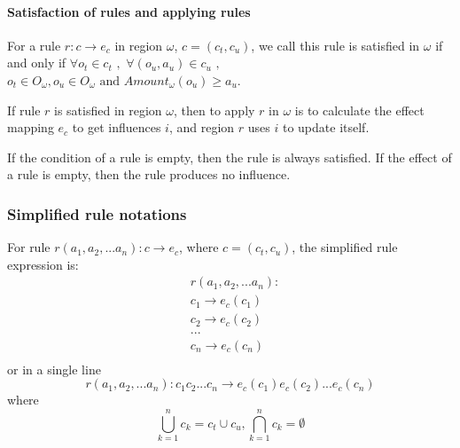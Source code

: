 \documentclass[9pt,a4paper,twoside]{article}
\begin{document}
            \paragraph{Satisfaction of rules and applying rules}  
                       
                For a rule $r: c \rightarrow e_c$ in region $\omega$, $c = (c_t, c_u)$, we call this rule is satisfied in $\omega$ if and only if 
                $\forall o_t \in c_t$ $,$ $ \forall (o_u, a_u) \in c_u$ $,$ $o_t \in O_{\omega}, o_u \in O_{\omega} \text{ and } Amount_\omega(o_u) \geq a_u$.
                
                If rule $r$ is satisfied in region $\omega$, then to apply $r$ in $\omega$ is to calculate the effect mapping $e_c$ to get influences $i$,
                and region $r$ uses $i$ to update itself.
                
                If the condition of a rule is empty, then the rule is always satisfied. If the effect of a rule is empty, then the rule produces no influence.
    
        \subsubsection{Simplified rule notations}
        
            For rule $r(a_1,a_2,...a_n): c \rightarrow e_c$, where $c=(c_t, c_u)$, the simplified rule expression is:
            \begin{equation}
                \begin{align}
                    &r(a_1,a_2,...a_n): \\
                    &c_1 \rightarrow e_c(c_1)  \\
                    &c_2 \rightarrow e_c(c_2)  \\
                    &...\\
                    &c_n \rightarrow e_c(c_n)  \\
                \end{align}
            \end{equation}
            or in a single line
            \begin{equation}
                r(a_1,a_2,...a_n): c_1c_2...c_n \rightarrow e_c(c_1)e_c(c_2)...e_c(c_n)
            \end{equation}
            where
            \begin{equation}
                \bigcup_{k = 1}^{n}{c_k} = c_t \cup c_u, \bigcap_{k = 1}^{n}{c_k} = \emptyset
            \end{equation}
            
\end{document}

